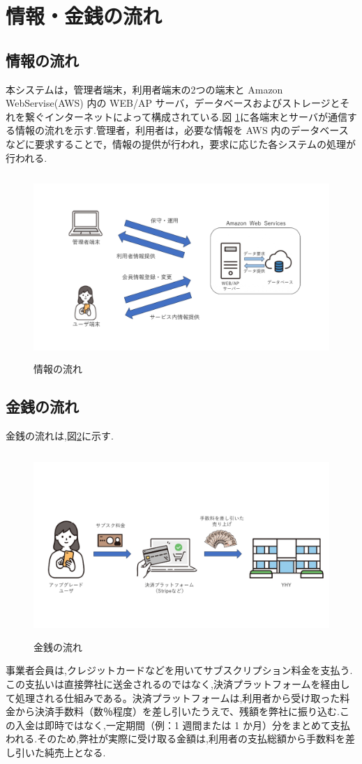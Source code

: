 \section{情報・金銭の流れ}
\subsection{情報の流れ}
本システムは，管理者端末，利用者端末の2つの端末と Amazon WebServise(AWS) 内の WEB/AP サーバ，データベースおよびストレージとそれを繋ぐインターネットによって構成されている.図 \ref{fig:Q7}に各端末とサーバが通信する情報の流れを示す.管理者，利用者は，必要な情報を AWS 内のデータベースなどに要求することで，情報の提供が行われ，要求に応じた各システムの処理が行われる.

\begin{figure}[H]
        \centering
        \includegraphics[width=12cm, height=7cm]{sections/pictures/4-1_info.jpg}
        \caption{情報の流れ}
        \label{fig:Q7}
\end{figure}



\subsection{金銭の流れ}
金銭の流れは,図\ref{fig:Q8}に示す.

\begin{figure}[H]
        \centering
        \includegraphics[width=12cm, height=7cm]{sections/pictures/4-2_money.jpg}
        \caption{金銭の流れ}
        \label{fig:Q8}
\end{figure}

事業者会員は,クレジットカードなどを用いてサブスクリプション料金を支払う.この支払いは直接弊社に送金されるのではなく,決済プラットフォームを経由して処理される仕組みである。決済プラットフォームは,利用者から受け取った料金から決済手数料（数％程度）を差し引いたうえで、残額を弊社に振り込む.この入金は即時ではなく,一定期間（例：1 週間または 1 か月）分をまとめて支払われる.そのため,弊社が実際に受け取る金額は,利用者の支払総額から手数料を差し引いた純売上となる.







